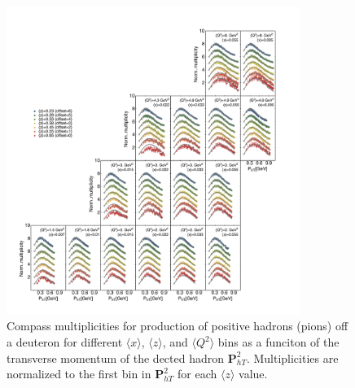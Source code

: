 \documentclass[aps,preprintnumbers,showpacs,nofootinbib,superscriptaddress,floatfix]{revtex4}
\begin{document}
\begin{figure}[h!]
\begin{center}
\includegraphics[width=0.85\textwidth]{plots/Compass/COMPASS_SCIplot_flINDEP_Piplus.pdf}
\end{center}
\caption{Compass multiplicities for production of positive hadrons (pions) off a deuteron for different $\langle x \rangle$, $\langle z \rangle$, and $\langle Q^2 \rangle$ bins as a funciton of the transverse momentum of the dected hadron ${\bm P}_{hT}^ 2$. Multiplicities are normalized to the first bin in ${\bm P}_{hT}^ 2$ for each $\langle z \rangle$ value.} 
\label{f:C_pip}
\end{figure}
\end{document}
